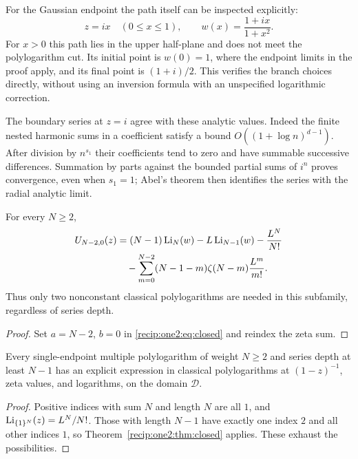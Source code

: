 For the Gaussian endpoint the path itself can be inspected explicitly:
\[
 z=ix\quad(0\le x\le1),\qquad
 w(x)=\frac{1+ix}{1+x^2}.
\]
For $x>0$ this path lies in the upper half-plane and does not meet the
polylogarithm cut.  Its initial point is $w(0)=1$, where the endpoint
limits in the proof apply, and its final point is $(1+i)/2$.  This
verifies the branch choices directly, without using an inversion
formula with an unspecified logarithmic correction.

The boundary series at $z=i$ agree with these analytic values.
Indeed the finite nested harmonic sums in a coefficient satisfy a
bound $O((1+\log n)^{d-1})$.  After division by $n^{s_1}$ their
coefficients tend to zero and have summable successive differences.
Summation by parts against the bounded partial sums of $i^n$ proves
convergence, even when $s_1=1$; Abel's theorem then identifies the
series with the radial analytic limit.

\begin{corollary}
\label{recip:one2:cor:last}
For every $N\ge2$,
\begin{align}
 U_{N-2,0}(z)
 &=(N-1)\operatorname{Li}_N(w)-L\operatorname{Li}_{N-1}(w)-\frac{L^N}{N!}\notag\\
 &\quad-\sum_{m=0}^{N-2}(N-1-m)\zeta(N-m)\frac{L^m}{m!}.
 \label{recip:one2:eq:last}
\end{align}
Thus only two nonconstant classical polylogarithms are needed in this
subfamily, regardless of series depth.
\end{corollary}
\begin{proof}
Set $a=N-2$, $b=0$ in \eqref{recip:one2:eq:closed} and reindex the zeta sum.
\end{proof}

\begin{corollary}
\label{recip:one2:cor:toplayers}
Every single-endpoint multiple polylogarithm of weight $N\ge2$ and
series depth at least $N-1$ has an explicit expression in classical
polylogarithms at $(1-z)^{-1}$, zeta values, and logarithms, on the
domain $\mathcal D$.
\end{corollary}
\begin{proof}
Positive indices with sum $N$ and length $N$ are all $1$, and
$\operatorname{Li}_{\{1\}^N}(z)=L^N/N!$. Those with length $N-1$ have exactly one
index $2$ and all other indices $1$, so Theorem~\ref{recip:one2:thm:closed}
applies. These exhaust the possibilities.
\end{proof}

